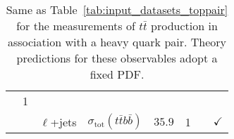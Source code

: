 \begin{table}[t]
\begin{center}
{\begin{tabular}{lcccccc|c}
    & 1
    & \cite{CMS:2020grm}
    & \\
     & 
    & $\ell$+jets
    & $\sigma_{\text{tot}}(t\bar{t}b\bar{b})$
    & $35.9$
    & 1
    & \cite{CMS:2020grm}
    &$\checkmark$ \\
\bottomrule
   \end{tabular}
   \vspace{0.3cm}
  \caption{\small  Same as Table~\ref{tab:input_datasets_toppair} for
    the measurements of $t\bar{t}$ production in association with a heavy quark
    pair.
    Theory predictions for these observables adopt a fixed PDF.
     \label{tab:input_datasets2c}
   }
}
\end{center}
\end{table}

